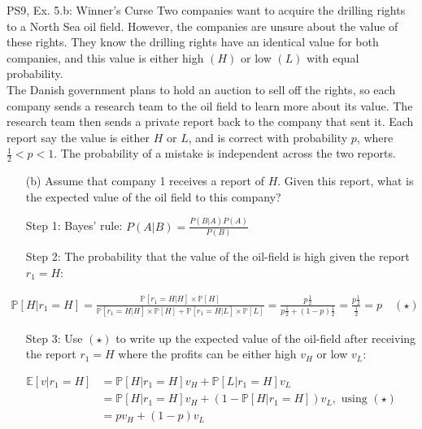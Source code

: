 \begin{frame}{PS9, Ex. 5.b: Winner's Curse}
      Two companies want to acquire the drilling rights to a North Sea oil field. However, the companies are unsure about the value of these rights. They know the drilling rights have an identical value for both companies, and this value is either high $(H)$ or low $(L)$ with equal probability.\\\smallskip
      The Danish government plans to hold an auction to sell off the rights, so each company sends a research team to the oil field to learn more about its value. The research team then sends a private report back to the company that sent it. Each report say the value is either $H$ or $L$, and is correct with probability $p$, where $\frac{1}{2} < p < 1$. The probability of a mistake is independent across the two reports.
      \begin{itemize}
        \item[(b)] Assume that company 1 receives a report of $H$. Given this report, what is the expected value of the oil field to this company?
        \item[Step 1:] Bayes' rule: $P(A|B)=\frac{P(B|A)P(A)}{P(B)}$
        \item[Step 2:] The probability that the value of the oil-field is high given the report $r_1=H$:
        \end{itemize}
        \vspace{-8pt}
        \begin{align*}
          \mathbb{P}[H|r_1=H]=\frac{\mathbb{P}[r_1=H|H]\times\mathbb{P}[H]}{\mathbb{P}[r_1=H|H]\times\mathbb{P}[H]+\mathbb{P}[r_1=H|L]\times\mathbb{P}[L]}=\frac{p\frac{1}{2}}{p\frac{1}{2}+(1-p)\frac{1}{2}}=\frac{p\frac{1}{2}}{\frac{1}{2}}=p\quad (\star)
        \end{align*}
        \vspace{-10pt}
        \begin{itemize}
        \item[Step 3:] Use $(\star)$ to write up the expected value of the oil-field after receiving the report $r_1=H$ where the profits can be either high $v_H$ or low $v_L$:
      \end{itemize}
      \vspace{-6pt}
      \begin{align*}
        \mathbb{E}[v|r_1=H]&=\mathbb{P}[H|r_1=H]v_H+\mathbb{P}[L|r_1=H]v_L\\
        &=\mathbb{P}[H|r_1=H]v_H+\left(1-\mathbb{P}[H|r_1=H]\right)v_L,\text{ using }(\star)\\
        &=pv_H+(1-p)v_L
      \end{align*}
      \vfill\null
\end{frame}



